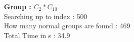 \textbf{Group : $C_2*C_{10}$}\\
Searching up to index : 500\\
How many normal groups are found : 469\\
Total Time in s : 34.9\\
